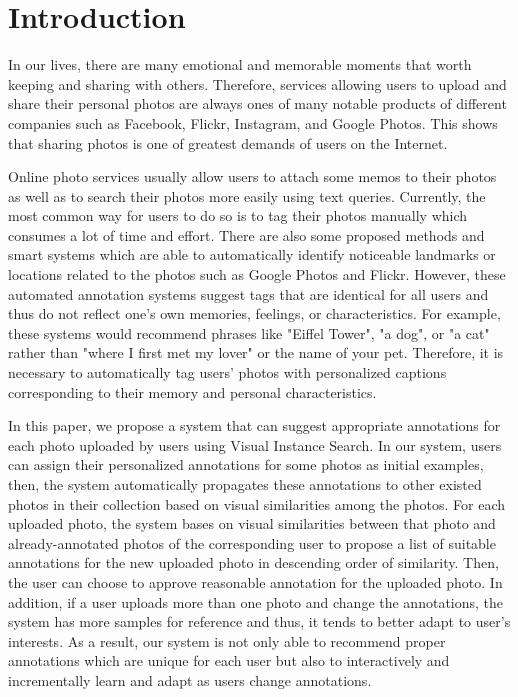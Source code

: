 % 

\section{Introduction} \label{section:introduction}

In our lives, there are many emotional and memorable moments that worth keeping and sharing with others. Therefore, services allowing users to upload and share their personal photos are always ones of many notable products of different companies such as Facebook, Flickr, Instagram, and Google Photos. This shows that sharing photos is one of greatest demands of users on the Internet. 

Online photo services usually allow users to attach some memos to their photos as well as to search their photos more easily using text queries. Currently, the most common way for users to do so is to tag their photos manually which consumes a lot of time and effort. There are also some proposed methods \cite{icml2013_chen13e,Lan_2013_CVPR} and smart systems which are able to automatically identify noticeable landmarks or locations related to the photos such as Google Photos and Flickr. However, these automated annotation systems suggest tags that are identical for all users and thus do not reflect one's own memories, feelings, or characteristics. For example, these systems would recommend phrases like "Eiffel Tower", "a dog", or "a cat" rather than "where I first met my lover" or the name of your pet. Therefore, it is necessary to automatically tag users' photos with personalized captions corresponding to their memory and personal characteristics.

In this paper, we propose a system that can suggest appropriate annotations for each photo uploaded by users using Visual Instance Search. In our system, users can assign their personalized annotations for some photos as initial examples, then, the system automatically propagates these annotations to other existed photos in their collection based on visual similarities among the photos. For each uploaded photo, the system bases on visual similarities between that photo and already-annotated photos of the corresponding user to propose a list of suitable annotations for the new uploaded photo in descending order of similarity. Then, the user can choose to approve reasonable annotation for the uploaded photo. In addition, if a user uploads more than one photo and change the annotations, the system has more samples for reference and thus, it tends to better adapt to user's interests. As a result, our system is not only able to recommend proper annotations which are unique for each user but also to interactively and incrementally learn and adapt as users change annotations.

